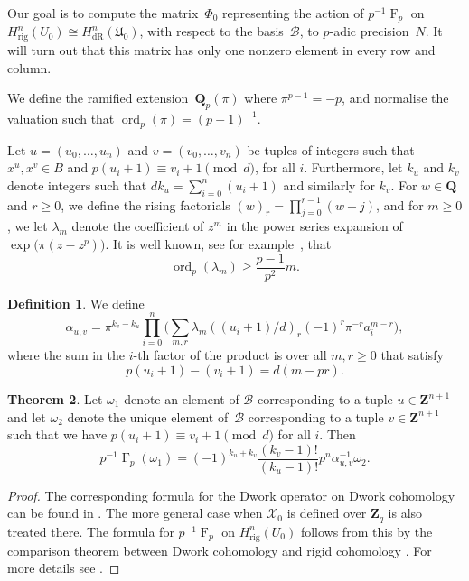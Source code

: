 \documentclass[a4paper,11pt]{article}
\numberwithin{equation}{section}
\newcommand{\ZZ}{\mathbf{Z}} %
\newcommand{\QQ}{\mathbf{Q}} %
\DeclareMathOperator{\ord}{ord}          %
\DeclareMathOperator{\Frob}{F}           %
\providecommand{\HdR}{H_{\text{dR}}}    %
\providecommand{\Hrig}{H_{\text{rig}}}  %
\providecommand{\cB}{\mathcal{B}} %
\theoremstyle{definition}
\newtheorem{thm}{Theorem}[section]
\newtheorem{defn}[thm]{Definition}
\begin{document}
Our goal is to compute 
the matrix~$\Phi_0$ representing the action of $p^{-1} \Frob_p$ on 
$\Hrig^n(U_0) \cong \HdR^n(\mathfrak{U}_0)$, with respect to the basis~$\cB$, 
to $p$-adic precision~$N$. It will turn out that this matrix has only one
nonzero element in every row and column.

We define the ramified extension~$\QQ_p(\pi)$ where $\pi^{p-1} = -p$, 
and normalise the valuation such that \mbox{$\ord_p(\pi) = (p-1)^{-1}$}.

Let $u = (u_0, \dotsc, u_n)$ and $v = (v_0, \dotsc, v_n)$ be tuples 
of integers such that $x^u, x^v \in B$ and $p (u_i+1) \equiv v_i+1 \pmod{d}$,
for all $i$. Furthermore, let $k_u$ and $k_v$ denote integers such that 
$d k_u = \sum_{i=0}^n (u_i + 1)$ and similarly for $k_v$. For $w \in \QQ$ 
and $r \geq 0$, we define the rising factorials $(w)_r = \prod_{j=0}^{r-1} (w + j)$, 
and for $m \geq 0$, we let $\lambda_m$ denote the coefficient of $z^m$ in the power series expansion 
of $\exp \bigl( \pi (z - z^p) \bigr)$. It is well known, see for example~\cite{Dwork1962}, that
\begin{equation} \label{eqn:dworkbound}
\ord_p(\lambda_m) \geq \frac{p-1}{p^2} m. 
\end{equation}

\begin{defn} We define \label{defn:alpha}
\[
\alpha_{u,v} = \pi^{k_v - k_u} \prod_{i = 0}^n \biggl( \sum_{m, r} \lambda_m ((u_i + 1) / d)_r (-1)^r \pi^{-r} a_i^{m-r} \biggr),
\]
where the sum in the $i$-th factor of the product is over all $m, r \geq 0$  
that satisfy
\[
p(u_i+1)-(v_i+1)=d(m-pr).
\]
\end{defn}

\begin{thm} \label{thm:01-03-diagfrob}
Let $\omega_1$ denote an element of $\cB$ corresponding to a tuple 
$u \in \ZZ^{n+1}$ and let $\omega_2$ denote the unique element of~$\cB$ 
corresponding to a tuple $v \in \ZZ^{n+1}$ such that
we have $p (u_i + 1) \equiv v_i + 1 \pmod{d}$ for all $i$. Then
\begin{equation*}
p^{-1} \Frob_p (\omega_1) = 
    (-1)^{k_u + k_v} \frac{(k_v - 1)!}{(k_u - 1)!} p^n \alpha_{u,v}^{-1} \omega_2.
\end{equation*}
\end{thm}

\begin{proof}
The corresponding formula for the Dwork operator on Dwork cohomology can
be found in %
\citep[\S 6.1]{Lauder2004b}. The more general case when $\mathcal{X}_0$ 
is defined over $\ZZ_q$ is also treated there. The formula for $p^{-1} \Frob_p$ on $\Hrig^n(U_0)$ 
follows from this by the comparison theorem between Dwork cohomology 
and rigid cohomology \cite[Theorem 1.12]{Katz}. For more details see 
\cite[Theorem 4.4]{Gerkmann2007}.
\end{proof}
\end{document}
